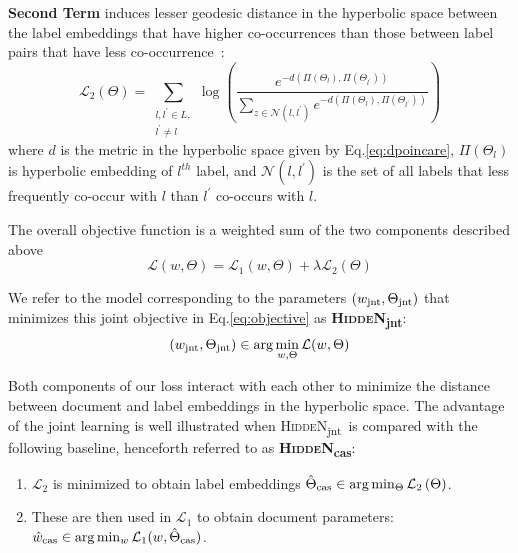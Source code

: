 \documentclass[11pt,a4paper]{article}
\def\calN{\mathcal{N}}
\def\calL{\mathcal{L}}
\newcommand{\modeljnt}{\mbox{\textsc{HiddeN}\textsubscript{jnt}}}
\newcommand{\modelcas}{\mbox{\textsc{HiddeN}\textsubscript{cas}}}
\begin{document}
\textbf{Second Term} induces lesser geodesic distance in the hyperbolic space between the label embeddings that have higher co-occurrences than those between label pairs that have less co-occurrence~\cite{lorentz}:
\begin{equation}
    \mathcal{L}_2(\Theta) = \sum_{\substack{l, l^\prime \in L,\\l^{\prime}\ne l}}
    \log\left(\frac{e^{-d\left(\Pi\left(\Theta_l\right), \Pi\left(\Theta_{l^\prime}\right)\right)}}{\sum\limits_{z\in\calN\left(l, l^{\prime}\right)}e^{-d\left(\Pi\left(\Theta_l\right), \Pi\left(\Theta_{l^\prime}\right)\right)}}\right)
    \label{eq:comp2}
\end{equation}
where $d$ is the metric in the hyperbolic space given by Eq.\ref{eq:dpoincare}, $\Pi(\Theta_l)$ is hyperbolic embedding of $l^{th}$ label, and $\calN\left(l, l^{\prime}\right)$ is the set of all labels that less frequently co-occur with $l$ than $l^\prime$ co-occurs with $l$.

The overall objective function is a weighted sum of the two components described above
\begin{equation}
    \calL\left(w,\Theta\right) = \calL_1\left(w,\Theta\right) + \lambda \calL_2\left(\Theta\right)
    \label{eq:objective}
\end{equation}

We refer to the model corresponding to the parameters $(w_{\textup{jnt}},\Theta_{\textup{jnt}})$ that minimizes this joint objective in Eq.\ref{eq:objective} as \textbf{\modeljnt}:
\begin{equation}
    (w_{\textup{jnt}},\Theta_{\textup{jnt}})\in\arg\min_{w,\Theta} \calL(w,\Theta)
\end{equation}

Both components of our loss interact with each other to minimize the distance between document and label embeddings in the hyperbolic space. The advantage of the joint learning is well illustrated when \modeljnt\ is compared with the following baseline, henceforth referred to as \textbf{\modelcas}:
\begin{enumerate}[label=(\arabic*),topsep=0pt,itemsep=-1ex,partopsep=1ex,parsep=1ex,leftmargin=*]
    \item $\calL_2$ is minimized to obtain label embeddings $\hat{\Theta}_{\textup{cas}}\in\arg\min_{\Theta}\calL_2\left(\Theta\right)$.
    \item These are then used in $\calL_1$ to obtain document parameters: $\hat{w}_\textup{cas}\in\arg\min_{w}\calL_1(w,\hat{\Theta}_\textup{cas})$.
\end{enumerate}
\end{document}
